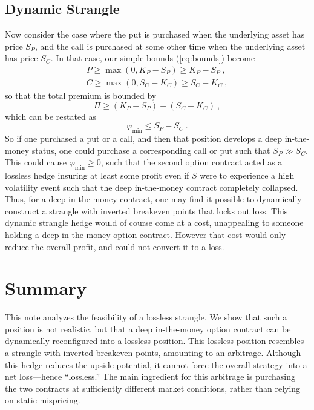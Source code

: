 \documentclass[aps,reprint]{revtex4-2}
\begin{document}
\subsection{Dynamic Strangle}
Now consider the case where the put is purchased when the underlying asset has price $S_P$, and the call is purchased at some other time when the underlying asset has price $S_C$.  In that case, our simple bounds (\ref{eq:bounds}) become
\begin{subequations} \label{eq:dynamicbounds}
\begin{align}
P \geq \max(0, K_P - S_P) \geq K_P - S_P~,\\
C \geq \max(0, S_C - K_C) \geq S_C - K_C~,
\end{align}
\end{subequations}
so that the total premium is bounded by
\begin{equation}
\Pi \geq (K_P - S_P) + (S_C - K_C)~,
\end{equation}
which can be restated as
\begin{equation}
\varphi_{\min} \leq S_P - S_C~.
\end{equation}
So if one purchased a put or a call, and then that position develops a deep in-the-money status, one could purchase a corresponding call or put such that $S_P \gg S_C$.  This could cause $\varphi_{\min} \geq 0$, such that the second option contract acted as a lossless hedge insuring at least some profit even if $S$ were to experience a high volatility event such that the deep in-the-money contract completely collapsed.
Thus, for a deep in-the-money contract, one may find it possible to dynamically construct a strangle with inverted breakeven points that locks out loss.  This dynamic strangle hedge would of course come at a cost, unappealing to someone holding a deep in-the-money option contract. However that cost would only reduce the overall profit, and could not convert it to a loss.

\section{Summary}

This note analyzes the feasibility of a lossless strangle. We show that such a position is not realistic, but that a deep in-the-money option contract can be dynamically reconfigured into a lossless position.  This lossless position resembles a strangle with inverted breakeven points, amounting to an arbitrage.  Although this hedge reduces the upside potential, it cannot force the overall strategy into a net loss—hence “lossless.”  The main ingredient for this arbitrage is purchasing the two contracts at sufficiently different market conditions, rather than relying on static mispricing.
\end{document}
